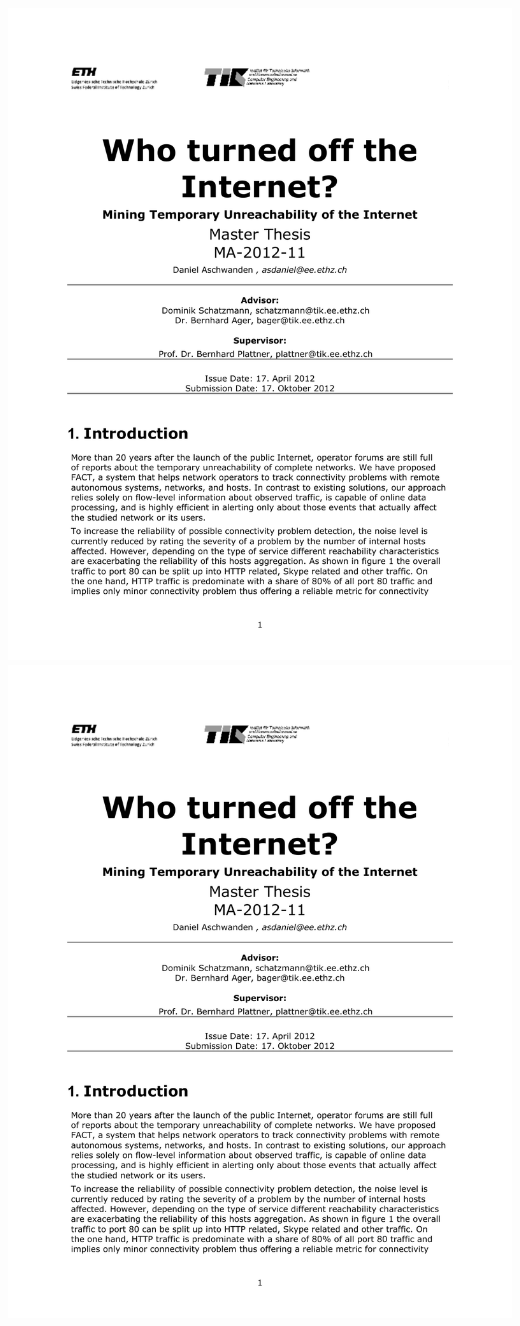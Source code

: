 \includegraphics[width=\textwidth, page=2]{ThesisDescription.pdf}
\newpage
\includegraphics[width=\textwidth, page=3]{ThesisDescription.pdf}
